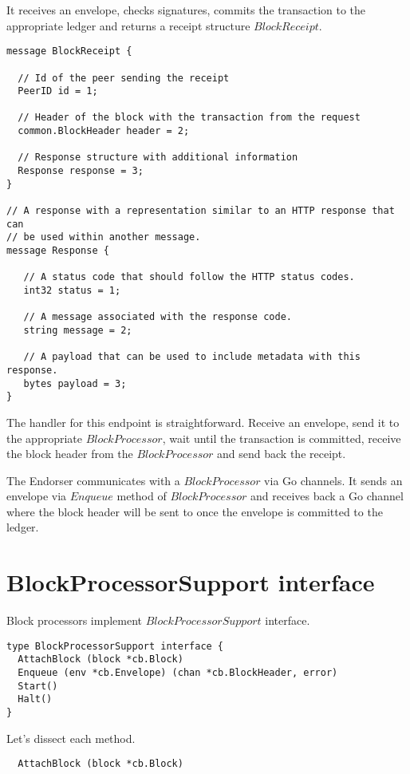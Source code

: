 It receives an envelope, checks signatures, commits the transaction to the appropriate ledger and returns a receipt structure $BlockReceipt$.

\begin{lstlisting}
message BlockReceipt {

  // Id of the peer sending the receipt
  PeerID id = 1;

  // Header of the block with the transaction from the request
  common.BlockHeader header = 2;

  // Response structure with additional information
  Response response = 3;
}

// A response with a representation similar to an HTTP response that can
// be used within another message.
message Response {

   // A status code that should follow the HTTP status codes.
   int32 status = 1;

   // A message associated with the response code.
   string message = 2;

   // A payload that can be used to include metadata with this response.
   bytes payload = 3;
}
\end{lstlisting}

The handler for this endpoint is straightforward. Receive an envelope, send it to the appropriate $BlockProcessor$, wait until the transaction is committed, receive the block header from the $BlockProcessor$ and send back the receipt.

The Endorser communicates with a $BlockProcessor$ via Go channels.
It sends an envelope via $Enqueue$ method of $BlockProcessor$ and receives back a Go channel where the block header will be sent to once the envelope is committed to the ledger.

\section{BlockProcessorSupport interface}
\label{sec:bp-interface}

Block processors implement $BlockProcessorSupport$ interface.

\begin{lstlisting}
type BlockProcessorSupport interface {
  AttachBlock (block *cb.Block)
  Enqueue (env *cb.Envelope) (chan *cb.BlockHeader, error)
  Start()
  Halt()
}
\end{lstlisting}

Let's dissect each method.

\begin{lstlisting}
  AttachBlock (block *cb.Block)
\end{lstlisting}

